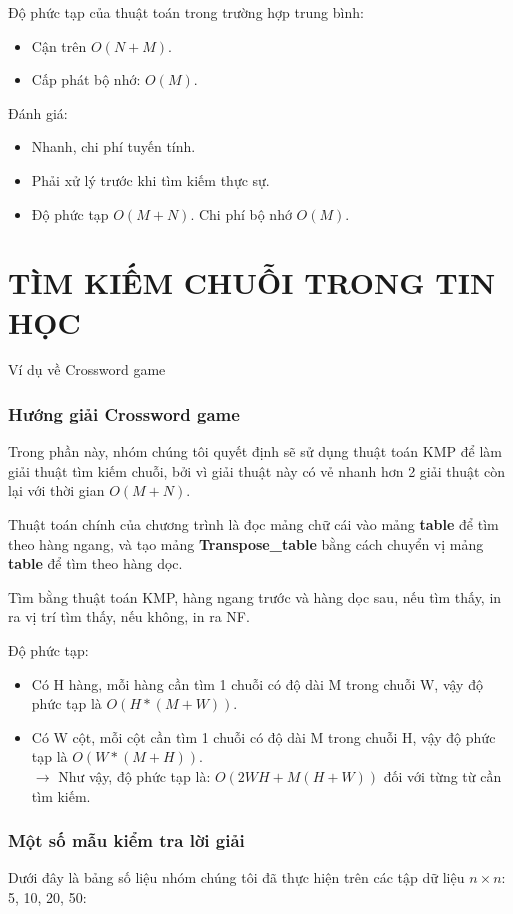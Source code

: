 \documentclass[a4paper,11pt]{article}
\begin{document}
\begin{enumerate}
			Độ phức tạp của thuật toán trong trường hợp trung bình:
			\begin{itemize}
				\item Cận trên $O(N + M)$.
				\item Cấp phát bộ nhớ: $O(M)$.
			\end{itemize}

			Đánh giá:
			\begin{itemize}
				\item Nhanh, chi phí tuyến tính.
				\item Phải xử lý trước khi tìm kiếm thực sự.
				\item Độ phức tạp $O(M + N)$. Chi phí bộ nhớ $O(M)$.
			\end{itemize}

	\end{enumerate}
	
	\part*{TÌM KIẾM CHUỖI TRONG TIN HỌC}
	\Large {Ví dụ về Crossword game}
	\setcounter{section}{0}
	\section{Hướng giải Crossword game}

	Trong phần này, nhóm chúng tôi quyết định sẽ sử dụng thuật toán KMP để làm giải thuật tìm kiếm chuỗi, bởi vì giải thuật này có vẻ nhanh hơn 2 giải thuật còn lại với thời gian $O(M + N)$.

	Thuật toán chính của chương trình là đọc mảng chữ cái vào mảng \textbf{table} để tìm theo hàng ngang, và tạo mảng \textbf{Transpose\_table} bằng cách chuyển vị mảng \textbf{table} để tìm theo hàng dọc.

	Tìm bằng thuật toán KMP, hàng ngang trước và hàng dọc sau, nếu tìm thấy, in ra vị trí tìm thấy, nếu không, in ra NF.

	Độ phức tạp:
	\begin{itemize}
		\item Có H hàng, mỗi hàng cần tìm 1 chuỗi có độ dài M trong chuỗi W, vậy độ phức tạp là $O(H*(M + W))$.
		\item Có W cột, mỗi cột cần tìm 1 chuỗi có độ dài M trong chuỗi H, vậy độ phức tạp là $O(W*(M + H))$.
		\\$\to$ Như vậy, độ phức tạp là: $O(2WH + M(H + W))$ đối với từng từ cần tìm kiếm.
	\end{itemize}
	\section{Một số mẫu kiểm tra lời giải}
	Dưới đây là bảng số liệu nhóm chúng tôi đã thực hiện trên các tập dữ liệu $n \times n$: 5, 10, 20, 50:
\end{document}
